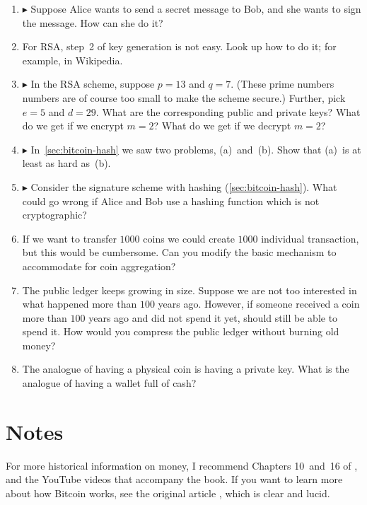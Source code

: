 \begin{enumerate}
\item
  $\blacktriangleright$
  Suppose Alice wants to send a secret message to Bob, and she wants to sign the message.
  How can she do it?

\item
  For RSA, step~2 of key generation is not easy.
  Look up how to do it; for example, in Wikipedia.

\item
  $\blacktriangleright$
  In the RSA scheme, suppose $p=13$ and $q=7$.
  (These prime numbers numbers are of course too small to make the scheme secure.)
  Further, pick $e=5$ and $d=29$.
  What are the corresponding public and private keys?
  What do we get if we encrypt $m=2$?
  What do we get if we decrypt $m=2$?

\item
  $\blacktriangleright$
  In~\autoref{sec:bitcoin-hash} we saw two problems, (a)~and~(b).
  Show that (a)~is at least as hard as~(b).

\item
  $\blacktriangleright$
  Consider the signature scheme with hashing (\autoref{sec:bitcoin-hash}).
  What could go wrong if Alice and Bob use a hashing function which is not cryptographic?

\item
  If we want to transfer $1000$ coins we could create $1000$ individual transaction, but this would be cumbersome.
  Can you modify the basic mechanism to accommodate for coin aggregation?

\item
  The public ledger keeps growing in size.
  Suppose we are not too interested in what happened more than $100$ years ago.
  However, if someone received a coin more than $100$ years ago and did not spend it yet, should still be able to spend it.
  How would you compress the public ledger without burning old money?

\item
  The analogue of having a physical coin is having a private key.
  What is the analogue of having a wallet full of cash?
\end{enumerate}

\section{Notes}

For more historical information on money, I recommend Chapters 10~and~16 of \citet{sapiens}, and the YouTube videos that accompany the book.
If you want to learn more about how Bitcoin works, see the original article \citep{bitcoin}, which is clear and lucid.


